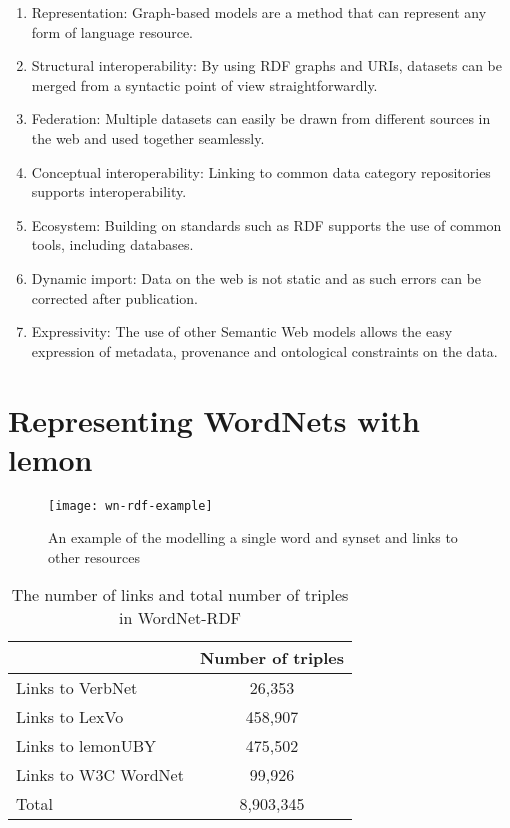 \documentclass[10pt, a4paper]{article}
\begin{document}
\begin{enumerate}
    \item Representation: Graph-based models are a method that can represent any
        form of language resource.
    \item Structural interoperability: By using RDF graphs and URIs, datasets can
        be merged from a syntactic point of view straightforwardly.
    \item Federation: Multiple datasets can easily be drawn from different
        sources in the web and used together seamlessly.
    \item Conceptual interoperability: Linking to common data category
        repositories supports interoperability.
        \item Ecosystem: Building on standards such as RDF supports the use of common
        tools, including databases.
    \item Dynamic import: Data on the web is not static and as such errors can
        be corrected after publication.
    \item Expressivity: The use of other Semantic Web models allows the easy
        expression of metadata, provenance and ontological constraints on the
        data.
\end{enumerate}

\section{Representing WordNets with lemon}

\begin{figure}
    \texttt{[image: wn-rdf-example]}
    \caption{An example of the modelling a single word and synset and links to
        other resources\label{modelling_example}}
\end{figure}



\begin{table}
  \begin{tabular}{p{50mm}|c}
     & Number of triples \\
    \hline
    Links to VerbNet & 26,353 \\
    Links to LexVo & 458,907 \\
    Links to lemonUBY & 475,502 \\
    Links to W3C WordNet & 99,926 \\
    \hline
    Total & 8,903,345 \\
  \end{tabular}
  \caption{The number of links and total number of triples in
      WordNet-RDF\label{triple_counts}}
\end{table}
\end{document}
